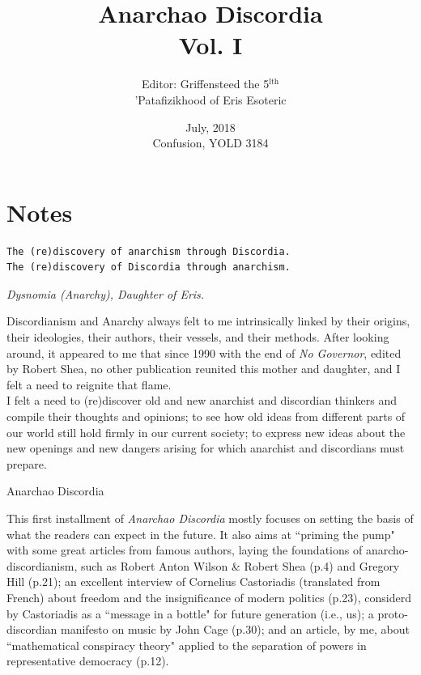 \documentclass[12pt, onecolumn, letterpaper, oneside]{book}
\title{Anarchao Discordia\\
		\vspace{1\baselineskip}
		\large{Vol. I}
		}
\date{July, 2018\\
		 Confusion, YOLD 3184}
\author{Editor: Griffensteed the 5$^\text{lth}$\\
			'Patafizikhood of Eris Esoteric\\}
\begin{document}
\sloppy

\maketitle

\tableofcontents

\chapter*{Notes}
\begin{verbatim}
The (re)discovery of anarchism through Discordia.
The (re)discovery of Discordia through anarchism.           
\end{verbatim}

\begin{center}
\emph{Dysnomia (Anarchy), Daughter of Eris.}\\
\end{center}

Discordianism and Anarchy always felt to me intrinsically linked by their origins, their ideologies, their authors, their vessels, and their methods. After looking around, it appeared to me that since 1990 with the end of \emph{No Governor}, edited by Robert Shea, no other publication reunited this mother and daughter, and I felt a need to reignite that flame.\\
I felt a need to (re)discover old and new anarchist and discordian thinkers and compile their thoughts and opinions; to see how old ideas from different parts of our world still hold firmly in our current society; to express new ideas about the new openings and new dangers arising for which anarchist and discordians must prepare.\\

\begin{center}
Anarchao Discordia\\
\end{center}

This first installment of \emph{Anarchao Discordia} mostly focuses on setting the basis of what the readers can expect in the future. It also aims at ``priming the pump" with some great articles from famous authors, laying the foundations of anarcho-discordianism, such as Robert Anton Wilson \& Robert Shea (p.4) and Gregory Hill (p.21); an excellent interview of Cornelius Castoriadis (translated from French) about freedom and the insignificance of modern politics (p.23), considerd by Castoriadis as a ``message in a bottle" for future generation (i.e., us); a proto-discordian manifesto on music by John Cage (p.30); and an article, by me, about ``mathematical conspiracy theory" applied to the separation of powers in representative democracy (p.12).\\
\end{document}
